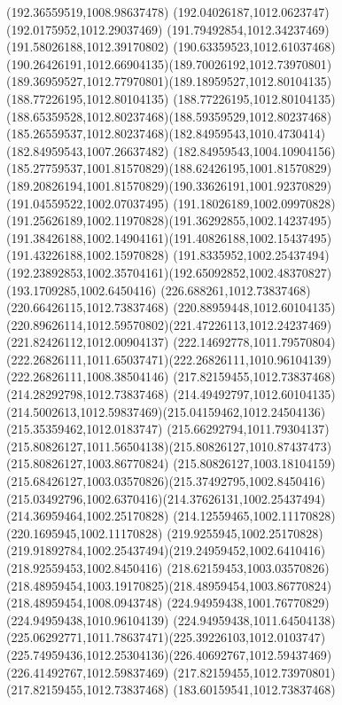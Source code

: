 {{\lineto(192.36559519,1008.98637478)
\lineto(192.04026187,1012.0623747)
\lineto(192.0175952,1012.29037469)
\lineto(191.79492854,1012.34237469)
\lineto(191.58026188,1012.39170802)
\curveto(190.63359523,1012.61037468)(190.26426191,1012.66904135)(189.70026192,1012.73970801)
\curveto(189.36959527,1012.77970801)(189.18959527,1012.80104135)(188.77226195,1012.80104135)
\curveto(188.77226195,1012.80104135)(188.65359528,1012.80237468)(188.59359529,1012.80237468)
\curveto(185.26559537,1012.80237468)(182.84959543,1010.4730414)(182.84959543,1007.26637482)
\curveto(182.84959543,1004.10904156)(185.27759537,1001.81570829)(188.62426195,1001.81570829)
\curveto(189.20826194,1001.81570829)(190.33626191,1001.92370829)(191.04559522,1002.07037495)
\curveto(191.18026189,1002.09970828)(191.25626189,1002.11970828)(191.36292855,1002.14237495)
\curveto(191.38426188,1002.14904161)(191.40826188,1002.15437495)(191.43226188,1002.15970828)
\curveto(191.8335952,1002.25437494)(192.23892853,1002.35704161)(192.65092852,1002.48370827)
\lineto(193.1709285,1002.6450416)
\closepath
\moveto(226.688261,1012.73837468)
\lineto(220.66426115,1012.73837468)
\lineto(220.88959448,1012.60104135)
\curveto(220.89626114,1012.59570802)(221.47226113,1012.24237469)(221.82426112,1012.00904137)
\curveto(222.14692778,1011.79570804)(222.26826111,1011.65037471)(222.26826111,1010.96104139)
\lineto(222.26826111,1008.38504146)
\lineto(217.82159455,1012.73837468)
\lineto(214.28292798,1012.73837468)
\lineto(214.49492797,1012.60104135)
\curveto(214.5002613,1012.59837469)(215.04159462,1012.24504136)(215.35359462,1012.0183747)
\curveto(215.66292794,1011.79304137)(215.80826127,1011.56504138)(215.80826127,1010.87437473)
\lineto(215.80826127,1003.86770824)
\curveto(215.80826127,1003.18104159)(215.68426127,1003.03570826)(215.37492795,1002.8450416)
\curveto(215.03492796,1002.6370416)(214.37626131,1002.25437494)(214.36959464,1002.25170828)
\lineto(214.12559465,1002.11170828)
\lineto(220.1695945,1002.11170828)
\lineto(219.9255945,1002.25170828)
\curveto(219.91892784,1002.25437494)(219.24959452,1002.6410416)(218.92559453,1002.8450416)
\curveto(218.62159453,1003.03570826)(218.48959454,1003.19170825)(218.48959454,1003.86770824)
\lineto(218.48959454,1008.0943748)
\lineto(224.94959438,1001.76770829)
\lineto(224.94959438,1010.96104139)
\curveto(224.94959438,1011.64504138)(225.06292771,1011.78637471)(225.39226103,1012.0103747)
\curveto(225.74959436,1012.25304136)(226.40692767,1012.59437469)(226.41492767,1012.59837469)
\closepath
\moveto(217.82159455,1012.73970801)
\lineto(217.82159455,1012.73837468)
\closepath
\moveto(183.60159541,1012.73837468)
}}
